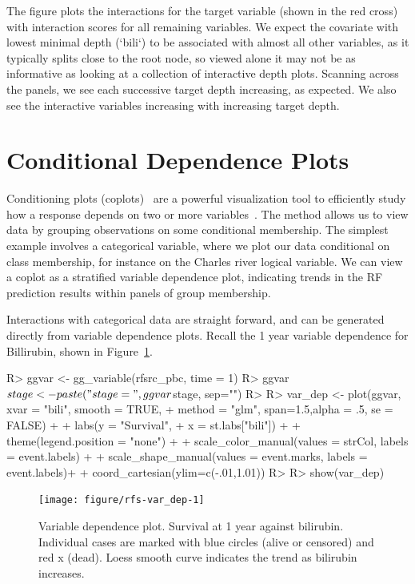 \documentclass[nojss]{jss}\usepackage[]{graphicx}\usepackage[]{color}
\begin{document}
The  figure plots the interactions for the target variable (shown in the red cross) with interaction scores for all remaining variables. We expect the covariate with lowest minimal depth (`bili`) to be associated with almost all other variables, as it typically splits close to the root node, so viewed alone it may not be as informative as looking at a collection of interactive depth plots. Scanning across the panels, we see each successive target depth increasing, as expected. We also see the interactive variables increasing with increasing target depth. 

\section{Conditional Dependence Plots}\label{S:coplots}

Conditioning plots (coplots)~\citep{chambers:1992,cleveland:1993}  are a powerful visualization tool to efficiently study how a response depends on two or more variables~\citep{cleveland:1993}. The method allows us to view data by grouping observations on some conditional membership. The simplest example involves a categorical variable, where we plot our data conditional on class membership, for instance on the Charles river logical variable. We can view a coplot as a stratified variable dependence plot, indicating trends in the RF prediction results within panels of group membership.

Interactions with categorical data are straight forward, and can be generated directly from variable dependence plots. Recall the 1 year variable dependence for Billirubin, shown in Figure~\ref{fig:var_dep}. 
\begin{Schunk}
\begin{Sinput}
R> ggvar <- gg_variable(rfsrc_pbc, time = 1)
R> ggvar$stage <- paste("stage=", ggvar$stage, sep="")
R> 
R> var_dep <- plot(ggvar, xvar = "bili", smooth = TRUE, 
+                 method = "glm", span=1.5,alpha = .5, se = FALSE) + 
+   labs(y = "Survival", 
+        x = st.labs["bili"]) + 
+   theme(legend.position = "none") + 
+   scale_color_manual(values = strCol, labels = event.labels) + 
+   scale_shape_manual(values = event.marks, labels = event.labels)+
+   coord_cartesian(ylim=c(-.01,1.01))
R> 
R> show(var_dep)
\end{Sinput}
\begin{figure}[!htpb]

{\centering \texttt{[image: figure/rfs-var\_dep-1]} 

}

\caption[Variable dependence plot]{Variable dependence plot. Survival at 1 year against bilirubin. Individual cases are marked with blue circles (alive or censored) and red x (dead). Loess smooth curve indicates the trend as bilirubin  increases.\label{fig:var_dep}}
\end{figure}
\end{Schunk}
\end{document}

